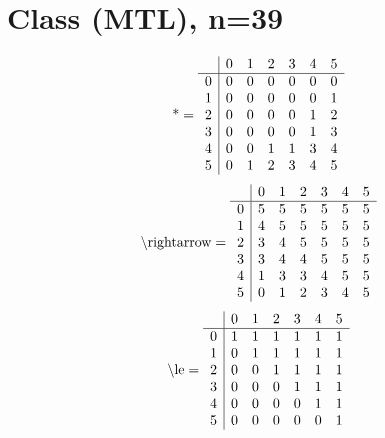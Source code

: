 \documentclass[11pt]{article}
\begin{document}
\section{Class (MTL), n=39}
\[\text{*} = 
\begin{array}{r | r r r r r r}
 & 0 & 1 & 2 & 3 & 4 & 5 \\ \hline
0 & 0 & 0 & 0 & 0 & 0 & 0 \\
1 & 0 & 0 & 0 & 0 & 0 & 1 \\
2 & 0 & 0 & 0 & 0 & 1 & 2 \\
3 & 0 & 0 & 0 & 0 & 1 & 3 \\
4 & 0 & 0 & 1 & 1 & 3 & 4 \\
5 & 0 & 1 & 2 & 3 & 4 & 5 \\
\end{array}
\]
\[\text{\textbackslash rightarrow} = 
\begin{array}{r | r r r r r r}
 & 0 & 1 & 2 & 3 & 4 & 5 \\ \hline
0 & 5 & 5 & 5 & 5 & 5 & 5 \\
1 & 4 & 5 & 5 & 5 & 5 & 5 \\
2 & 3 & 4 & 5 & 5 & 5 & 5 \\
3 & 3 & 4 & 4 & 5 & 5 & 5 \\
4 & 1 & 3 & 3 & 4 & 5 & 5 \\
5 & 0 & 1 & 2 & 3 & 4 & 5 \\
\end{array}
\]
\[\text{\textbackslash le} = 
\begin{array}{r | r r r r r r}
 & 0 & 1 & 2 & 3 & 4 & 5 \\ \hline
0 & 1 & 1 & 1 & 1 & 1 & 1 \\
1 & 0 & 1 & 1 & 1 & 1 & 1 \\
2 & 0 & 0 & 1 & 1 & 1 & 1 \\
3 & 0 & 0 & 0 & 1 & 1 & 1 \\
4 & 0 & 0 & 0 & 0 & 1 & 1 \\
5 & 0 & 0 & 0 & 0 & 0 & 1 \\
\end{array}
\]
\end{document}
